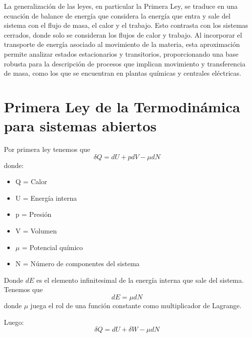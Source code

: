 
\begin{center}
 La generalización de las leyes, en particular la Primera Ley, se traduce en una ecuación de balance de energía que considera la energía que entra y sale del sistema con el flujo de masa, el calor y el trabajo. Esto contrasta con los sistemas cerrados, donde solo se consideran los flujos de calor y trabajo. Al incorporar el transporte de energía asociado al movimiento de la materia, esta aproximación permite analizar estados estacionarios y transitorios, proporcionando una base robusta para la descripción de procesos que implican movimiento y transferencia de masa, como los que se encuentran en plantas químicas y centrales eléctricas.
\end{center}

\section{Primera Ley de la Termodinámica para sistemas abiertos}

Por primera ley tenemos que 
\begin{equation}
    \delta Q = dU + pdV - \mu dN \tag{3.1}
\end{equation}
donde:
\begin{multicols}{2}
\begin{itemize}
    \item Q = Calor
    \item U = Energía interna
    \item p = Presión
    \item V = Volumen
    \item $\mu$ = Potencial químico
    \item N = Número de componentes del sistema
\end{itemize}
\end{multicols}

Donde $dE$ es el elemento infinitesimal de la energía interna que sale del sistema.
Tenemos que 
$$dE = \mu dN$$ 
donde $\mu$ juega el rol de una función constante como multiplicador de Lagrange.

Luego: 
\begin{equation}
    \delta Q = dU + \delta W - \mu dN \tag{3.2}
\end{equation}

